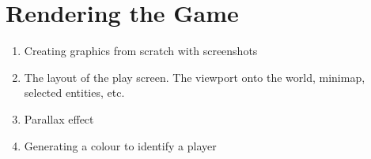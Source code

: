 \section{Rendering the Game}

\begin{enumerate}
\item Creating graphics from scratch with screenshots
\item The layout of the play screen. The viewport onto the world, minimap, selected entities, etc.
\item Parallax effect
\item Generating a colour to identify a player
\end{enumerate}

\begin{comment}
This section covers 2 aspects: How the world is rendered through a view port, and the parallax effect.

The view port is like a mapping from the window on the screen to the game world.
It shows a small rectangle of the game world in the window on the screen.
The view port into the game world can be moved around the game world showing different parts, or it can be resizes showing more or less detail of the game world.

This is achieved through transformations of the game world image, more specifically translation and scaling.


\end{comment}
